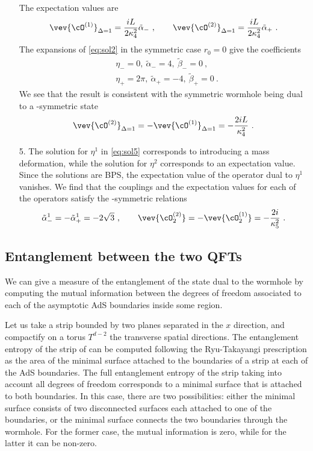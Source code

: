 \begin{enumerate}
The expectation values are
\begin{equation}\label{eq:vevaltquant}
	\vev{\cO^{(1)}}_{\Delta=1}=\frac{i L}{2\kappa_4^2 } \tilde\alpha_-
	\ ,\qquad
	\vev{\cO^{(2)}}_{\Delta=1}=\frac{iL}{2\kappa_4^2} \tilde\alpha_+\ .
\end{equation}
The expansions of \eqref{eq:sol2} in the symmetric case $r_0=0$ give the coefficients
\begin{equation}
\begin{split}
   & \eta_-=0,\ \tilde\alpha_-=4,\ \tilde\beta_-=0\ ,\\
   & \eta_+=2\pi,\ \tilde\alpha_+=-4,\ \tilde\beta_+=0\ .
\end{split}
\end{equation}
We see that the result is consistent with the symmetric wormhole being dual to a \PT-symmetric state
\begin{equation}
	\vev{\cO^{(2)}}_{\Delta=1}=-\vev{\cO^{(1)}}_{\Delta=1}=-\frac{2iL}{\kappa_4^2}\ .
\end{equation}

\item[5.] The solution for $\eta^1$ in \eqref{eq:sol5} corresponds to introducing a mass deformation, while the solution for $\eta^2$ corresponds to an expectation value. Since the solutions are BPS, the expectation value of the operator dual to $\eta^1$ vanishes. We find that the couplings and the expectation values for each of the operators satisfy the \PT-symmetric relations
\begin{equation}
	\tilde\alpha_-^1=-\tilde\alpha_+^1=-2\sqrt{3}
	\ ,\qquad
	\vev{\cO_2^{(2)}}=-\vev{\cO_2^{(1)}}=-\frac{2i}{\kappa^2_{5}}\ .
\end{equation}

\end{enumerate}

\subsection{Entanglement between the two QFTs}

We can give a measure of the entanglement of the state dual to the wormhole by computing the mutual information between the degrees of freedom associated to each of the asymptotic AdS boundaries inside some region. 

Let us take a strip bounded by two planes separated in the $x$ direction, and compactify on a torus $T^{d-2}$ the transverse spatial directions. The entanglement entropy of the strip of 
can be computed following the Ryu-Takayangi prescription as the area of the minimal surface attached to the boundaries of a strip at each of the AdS boundaries. The full entanglement entropy of the strip taking into account all degrees of freedom corresponds to a minimal surface that is attached to both boundaries. In this case, there are two possibilities: either the minimal surface consists of two disconnected surfaces each attached to one of the boundaries, or the minimal surface connects the two boundaries through the wormhole. For the former case, the mutual information is zero, while for the latter it can be non-zero.


